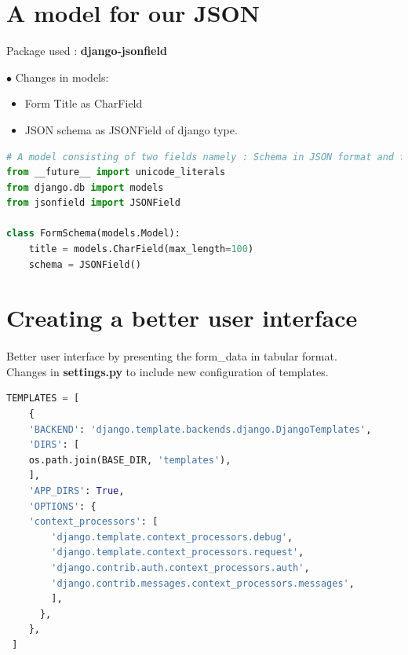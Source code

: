 \section{A model for our JSON}

Package used : \textbf{django-jsonfield}

$\bullet$ Changes in models:
\begin{itemize}
	\item Form Title as CharField
	\item JSON schema as JSONField of django type.
\end{itemize}
\begin{lstlisting}[language=python,numbers=none]
# A model consisting of two fields namely : Schema in JSON format and form title.
from __future__ import unicode_literals
from django.db import models
from jsonfield import JSONField

class FormSchema(models.Model):
	title = models.CharField(max_length=100)
	schema = JSONField()
\end{lstlisting}

\begin{center}
\end{center}

\section{Creating a better user interface}
\paragraph{}Better user interface by presenting the form\_data in tabular format.\\
Changes in \textbf{settings.py} to include new configuration of templates.\\
\begin{lstlisting}[language=python,numbers=none]
	TEMPLATES = [
	{
	'BACKEND': 'django.template.backends.django.DjangoTemplates',
	'DIRS': [
	os.path.join(BASE_DIR, 'templates'),
	],
	'APP_DIRS': True,
	'OPTIONS': {
	'context_processors': [
		'django.template.context_processors.debug',
		'django.template.context_processors.request',
		'django.contrib.auth.context_processors.auth',
		'django.contrib.messages.context_processors.messages',
		],
	  },
	},
 ]
\end{lstlisting}

